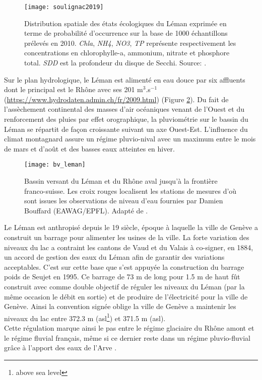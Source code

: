 \begin{figure}[h!]
\centering
\texttt{[image: soulignac2019]}
\caption{Distribution spatiale des états écologiques du Léman exprimée en terme de probabilité d'occurrence sur la base de 1000 échantillons prélevés en 2010. \textit{Chla}, \textit{NH4}, \textit{NO3}, \textit{TP} représente respectivement les concentrations en chlorophylle-a, ammonium, nitrate et phosphore total. \textit{SDD} est la profondeur du disque de Secchi. Source: \citet{soulignac2019}.}
\label{soulignacfig}
\end{figure}

Sur le plan hydrologique, le Léman est alimenté en eau douce par six affluents dont le principal est le Rhône avec ses 201 m$^{3}$.s$^{-1}$ (\url{https://www.hydrodaten.admin.ch/fr/2009.html}) (Figure \ref{bv-leman-cipel}). Du fait de l'assèchement continental des masses d'air océaniques venant de l'Ouest et du renforcement des pluies par effet orographique, la pluviométrie sur le bassin du Léman se répartit de façon croissante suivant un axe Ouest-Est. L'influence du climat montagnard assure un régime pluvio-nival avec un maximum entre le mois de mars et d'août et des basses eaux atteintes en hiver.\\

\begin{figure}[h!]
\texttt{[image: bv\_leman]}
\caption{Bassin versant du Léman et du Rhône aval jusqu'à la frontière franco-suisse. Les croix rouges localisent les stations de mesures d'où sont issues les observations de niveau d'eau fournies par Damien Bouffard (EAWAG/EPFL). Adapté de \citet{soulignac2019}.}
\label{bv-leman-cipel}
\end{figure}

\noindent Le Léman est anthropisé depuis le 19\ieme{} siècle, époque à laquelle la ville de Genève a construit un barrage pour alimenter les usines de la ville. La forte variation des niveaux du lac a contraint les cantons de Vaud et du Valais à co-signer, en 1884, un accord de gestion des eaux du Léman afin de garantir des variations acceptables. C'est sur cette base que s'est appuyée la construction du barrage poids de Seujet en 1995. Ce barrage de 73 m de long pour 1.5 m de haut fût construit avec comme double objectif de réguler les niveaux du Léman (par la même occasion le débit en sortie) et de produire de l'électricité pour la ville de Genève. Ainsi la convention signée oblige la ville de Genève a maintenir les niveaux du lac entre 372.3 m (asl\footnote{above sea level}) et 371.5 m (asl).\\
Cette régulation marque ainsi le pas entre le régime glaciaire du Rhône amont et le régime fluvial français, même si ce dernier reste dans un régime pluvio-fluvial grâce à l'apport des eaux de l'Arve \citep{ruiz2015}.


